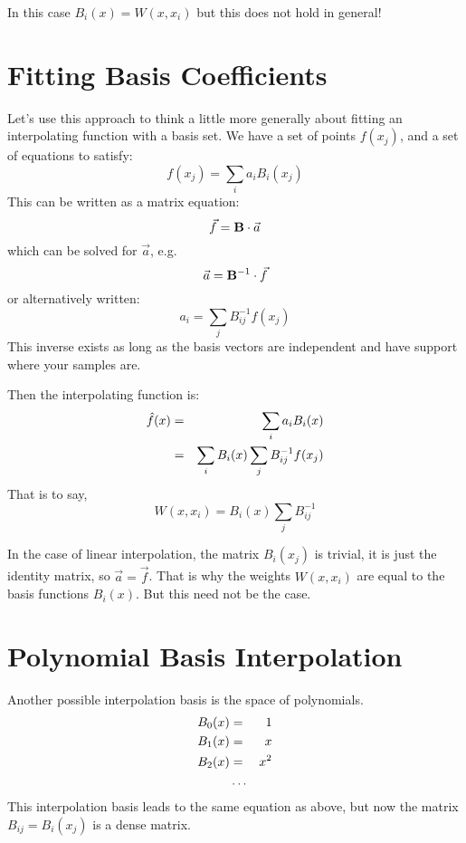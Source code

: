 In this case $B_i(x) = W(x, x_i)$ but this does not hold in general!

\section{Fitting Basis Coefficients}

Let's use this approach to think a little more generally about fitting
an interpolating function with a basis set.  We have a set of points
$f(x_j)$, and a set of equations to satisfy:
\begin{equation}
f(x_j) = \sum_i a_i B_i(x_j)
\end{equation}
This can be written as a matrix equation:
\begin{equation}
\vec{f} = {\bf B}\cdot \vec{a}
\end{equation}
which can be solved for $\vec{a}$, e.g. 
\begin{equation}
\vec{a} = {\bf B}^{-1}\cdot \vec{f}
\end{equation}
or alternatively written:
\begin{equation}
a_i = \sum_j {B}^{-1}_{ij} f(x_j)
\end{equation}
This inverse exists as long as the basis vectors are independent and
have support where your samples are.

Then the interpolating function is:
\begin{eqnarray}
\hat f(x) &=& \sum_i a_i B_i(x) \cr
&=& \sum_i B_i(x) \sum_j B^{-1}_{ij} f(x_j)
\end{eqnarray}
That is to say,
\begin{equation}
W(x, x_i) = B_i(x) \sum_j B^{-1}_{ij}
\end{equation}

In the case of linear interpolation, the matrix $B_i(x_j)$ is trivial,
it is just the identity matrix, so $\vec{a} = \vec{f}$. That is why
the weights $W(x, x_i)$ are equal to the basis functions $B_i(x)$.
But this need not be the case.

\section{Polynomial Basis Interpolation}

Another possible interpolation basis is the space of polynomials.
\begin{eqnarray}
B_0(x) &=& 1 \cr
B_1(x) &=& x \cr
B_2(x) &=& x^2 \cr
&\ldots&
\end{eqnarray}
This interpolation basis leads to the same equation as above, but now
the matrix $B_{ij} = B_i(x_j)$ is a dense matrix. 

